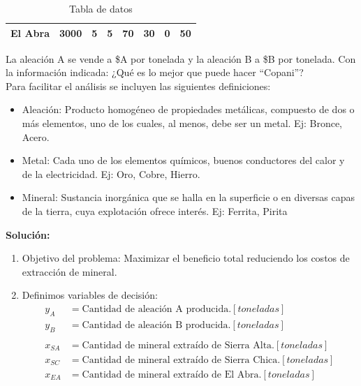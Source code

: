 \documentclass[../main.tex]{subfiles}
\begin{document}
\begin{exercise}
\begin{table}[h]
\begin{tabular}{|c|c|ccccc|c|}
                \textbf{El Abra}                  & 3000                                                                                                  & \multicolumn{1}{c|}{5}              & \multicolumn{1}{c|}{5}               & \multicolumn{1}{c|}{70}                 & \multicolumn{1}{c|}{30}            & 0              & 50                                                                                     \\ \hline
                \end{tabular}
                \caption{Tabla de datos}
            \end{table}
            
            La aleación A se vende a \$A por tonelada y la aleación B a \$B por tonelada. Con la información indicada: ¿Qué es lo mejor que puede hacer “Copani”?\\
            
            Para facilitar el análisis se incluyen las siguientes definiciones:
            \begin{itemize}
                \item Aleación: Producto homogéneo de propiedades metálicas, compuesto de dos o más elementos, uno de los cuales, al menos, debe ser un metal. Ej: Bronce, Acero.
                \item Metal: Cada uno de los elementos químicos, buenos conductores del calor y de la electricidad. Ej: Oro, Cobre, Hierro.
                \item Mineral: Sustancia inorgánica que se halla en la superficie o en diversas capas de la tierra, cuya explotación ofrece interés. Ej: Ferrita, Pirita
            \end{itemize}

            \textbf{Solución:}
            \begin{enumerate}
                \item Objetivo del problema: Maximizar el beneficio total reduciendo los costos de extracción de mineral.
                \item Definimos variables de decisión:
                    \begin{equation}
                        \begin{split}
                            y_A &= \text{Cantidad de aleación A producida.} [toneladas] \\
                            y_B &= \text{Cantidad de aleación B producida.} [toneladas] \\\\
                            x_{SA} &= \text{Cantidad de mineral extraído de Sierra Alta.} [toneladas] \\
                            x_{SC} &= \text{Cantidad de mineral extraído de Sierra Chica.} [toneladas] \\
                            x_{EA} &= \text{Cantidad de mineral extraído de El Abra.} [toneladas] \\\\
                        \end{split}
                    \end{equation}


\end{enumerate}
\end{exercise}
\end{document}
